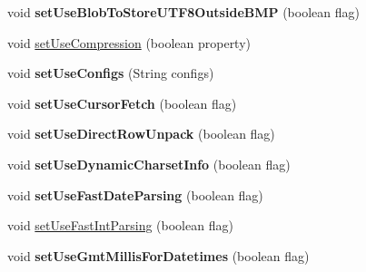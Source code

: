 \begin{DoxyCompactItemize}
void {\bfseries set\+Use\+Blob\+To\+Store\+U\+T\+F8\+Outside\+B\+MP} (boolean flag)
\item 
void \mbox{\hyperlink{classcom_1_1mysql_1_1jdbc_1_1jdbc2_1_1optional_1_1_connection_wrapper_a23ee905e6cb31af58b1cfc66edbd2050}{set\+Use\+Compression}} (boolean property)
\item 
\mbox{\label{classcom_1_1mysql_1_1jdbc_1_1jdbc2_1_1optional_1_1_connection_wrapper_ab4c31183bdba14f0a8e08b8a0774bf23}} 
void {\bfseries set\+Use\+Configs} (String configs)
\item 
\mbox{\label{classcom_1_1mysql_1_1jdbc_1_1jdbc2_1_1optional_1_1_connection_wrapper_acfe6e90a1ccf7606768c8caddb80573c}} 
void {\bfseries set\+Use\+Cursor\+Fetch} (boolean flag)
\item 
\mbox{\label{classcom_1_1mysql_1_1jdbc_1_1jdbc2_1_1optional_1_1_connection_wrapper_a3baac934c7b23c89ecbbecc80dbce297}} 
void {\bfseries set\+Use\+Direct\+Row\+Unpack} (boolean flag)
\item 
\mbox{\label{classcom_1_1mysql_1_1jdbc_1_1jdbc2_1_1optional_1_1_connection_wrapper_a96fe2ba6d38151580bc72a5d9c4c576f}} 
void {\bfseries set\+Use\+Dynamic\+Charset\+Info} (boolean flag)
\item 
\mbox{\label{classcom_1_1mysql_1_1jdbc_1_1jdbc2_1_1optional_1_1_connection_wrapper_ac4e1ff213a498cb16d11e777b82231ff}} 
void {\bfseries set\+Use\+Fast\+Date\+Parsing} (boolean flag)
\item 
void \mbox{\hyperlink{classcom_1_1mysql_1_1jdbc_1_1jdbc2_1_1optional_1_1_connection_wrapper_af424c555856eefbd0cad9ad2ffa0bf46}{set\+Use\+Fast\+Int\+Parsing}} (boolean flag)
\item 
\mbox{\label{classcom_1_1mysql_1_1jdbc_1_1jdbc2_1_1optional_1_1_connection_wrapper_a75ca0e066f1262f68730f560e70ac331}} 
void {\bfseries set\+Use\+Gmt\+Millis\+For\+Datetimes} (boolean flag)
\item 

\end{DoxyCompactItemize}
